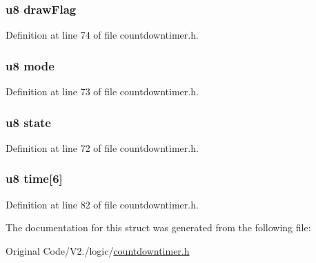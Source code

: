 \hypertarget{structcdtimer_a3e8544bc695992c4f9df78288018341b}{
\subsubsection[{draw\-Flag}]{\setlength{\rightskip}{0pt plus 5cm}u8 {\bf draw\-Flag}}}\label{structcdtimer_a3e8544bc695992c4f9df78288018341b}


\-Definition at line 74 of file countdowntimer.\-h.

\hypertarget{structcdtimer_a7cea6ae40aa46b41e3806213a39718c6}{
\subsubsection[{mode}]{\setlength{\rightskip}{0pt plus 5cm}u8 {\bf mode}}}\label{structcdtimer_a7cea6ae40aa46b41e3806213a39718c6}


\-Definition at line 73 of file countdowntimer.\-h.

\hypertarget{structcdtimer_ad0bc4e4e6e6ffc52d9079b73afd73887}{
\subsubsection[{state}]{\setlength{\rightskip}{0pt plus 5cm}u8 {\bf state}}}\label{structcdtimer_ad0bc4e4e6e6ffc52d9079b73afd73887}


\-Definition at line 72 of file countdowntimer.\-h.

\hypertarget{structcdtimer_a423004d470464f425592df7a003cd838}{
\subsubsection[{time}]{\setlength{\rightskip}{0pt plus 5cm}u8 {\bf time}\mbox{[}6\mbox{]}}}\label{structcdtimer_a423004d470464f425592df7a003cd838}


\-Definition at line 82 of file countdowntimer.\-h.



\-The documentation for this struct was generated from the following file\-:\begin{DoxyCompactItemize}
\item 
\-Original Code/\-V2./logic/\hyperlink{countdowntimer_8h}{countdowntimer.\-h}\end{DoxyCompactItemize}

